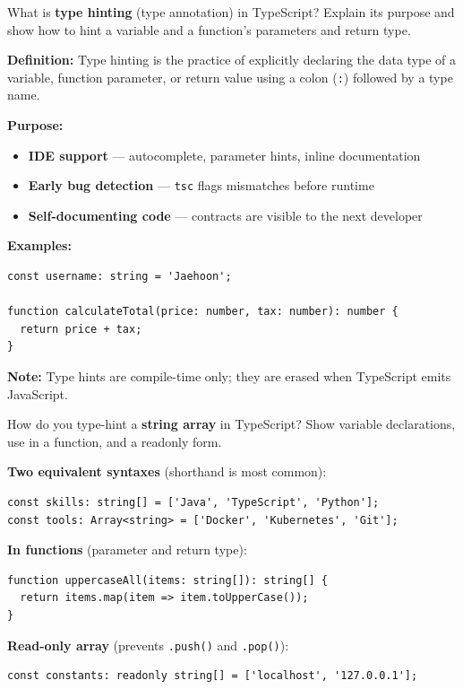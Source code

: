 \newpage




\question[6]
What is \textbf{type hinting} (type annotation) in TypeScript? Explain its purpose and show how to hint a variable and a function's parameters and return type.
\begin{solutionorbox}[4.5in]
\textbf{Definition:} Type hinting is the practice of explicitly declaring the data type of a variable, function parameter, or return value using a colon (\lstinline[style=tsinline]|:|) followed by a type name.

\textbf{Purpose:}
\begin{itemize}
  \item \textbf{IDE support} --- autocomplete, parameter hints, inline documentation
  \item \textbf{Early bug detection} --- \lstinline[style=bashinline]|tsc| flags mismatches before runtime
  \item \textbf{Self-documenting code} --- contracts are visible to the next developer
\end{itemize}

\textbf{Examples:}
\begin{lstlisting}[style=ts]
const username: string = 'Jaehoon';

function calculateTotal(price: number, tax: number): number {
  return price + tax;
}
\end{lstlisting}

\textbf{Note:} Type hints are compile-time only; they are erased when TypeScript emits JavaScript.
\end{solutionorbox}

\question[6]
How do you type-hint a \textbf{string array} in TypeScript? Show variable declarations, use in a function, and a readonly form.
\begin{solutionorbox}[4in]
\textbf{Two equivalent syntaxes} (shorthand is most common):
\begin{lstlisting}[style=ts]
const skills: string[] = ['Java', 'TypeScript', 'Python'];
const tools: Array<string> = ['Docker', 'Kubernetes', 'Git'];
\end{lstlisting}

\textbf{In functions} (parameter and return type):
\begin{lstlisting}[style=ts]
function uppercaseAll(items: string[]): string[] {
  return items.map(item => item.toUpperCase());
}
\end{lstlisting}

\textbf{Read-only array} (prevents \lstinline[style=tsinline]|.push()| and \lstinline[style=tsinline]|.pop()|):
\begin{lstlisting}[style=ts]
const constants: readonly string[] = ['localhost', '127.0.0.1'];
\end{lstlisting}
\end{solutionorbox}




